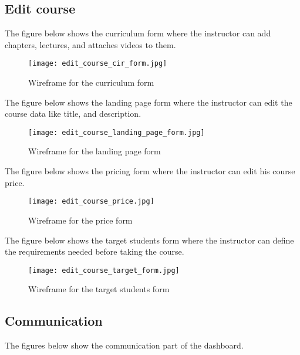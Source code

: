 \vfill
\clearpage

\subsection{Edit course}


The figure below shows the curriculum form where the instructor can add chapters, lectures, and attaches videos to them.

\begin{figure}[!ht]
    \centering
    \texttt{[image: edit\_course\_cir\_form.jpg]}
    \caption{Wireframe for the curriculum form}
    \label{fig:edit_course_cir_form}
\end{figure}

The figure below shows the landing page form where the instructor can edit the course data like title, and description.

\begin{figure}[!ht]
    \centering
    \texttt{[image: edit\_course\_landing\_page\_form.jpg]}
    \caption{Wireframe for the landing page form}
    \label{fig:edit_course_landing_page_form}
\end{figure}

The figure below shows the pricing form where the instructor can edit his course price.

\begin{figure}[!ht]
    \centering
    \texttt{[image: edit\_course\_price.jpg]}
    \caption{Wireframe for the price form}
    \label{fig:edit_course_price}
\end{figure}

\vfill
\clearpage

The figure below shows the target students form where the instructor can define the requirements needed before taking the course.

\begin{figure}[!ht]
    \centering
    \texttt{[image: edit\_course\_target\_form.jpg]}
    \caption{Wireframe for the target students form}
    \label{fig:edit_course_target_form}
\end{figure}

\vfill
\clearpage

\subsection{Communication}

The figures below show the communication part of the dashboard.

